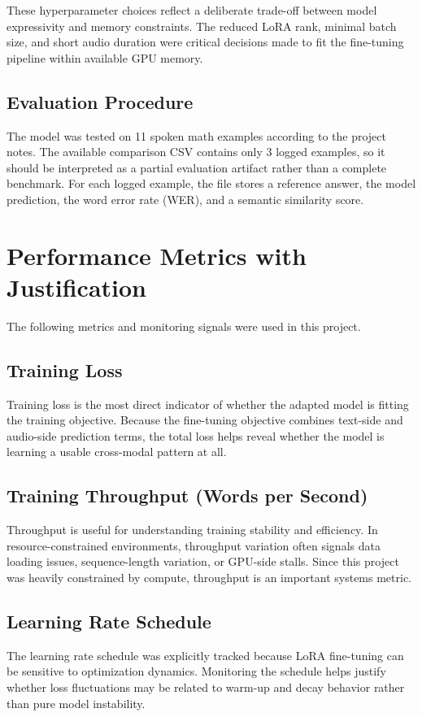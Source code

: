 \documentclass[12pt,a4paper]{article}
\begin{document}
These hyperparameter choices reflect a deliberate trade-off between model expressivity and memory constraints. The reduced LoRA rank, minimal batch size, and short audio duration were critical decisions made to fit the fine-tuning pipeline within available GPU memory.

\subsection{Evaluation Procedure}
The model was tested on 11 spoken math examples according to the project notes. The available comparison CSV contains only 3 logged examples, so it should be interpreted as a partial evaluation artifact rather than a complete benchmark. For each logged example, the file stores a reference answer, the model prediction, the word error rate (WER), and a semantic similarity score.

\section{Performance Metrics with Justification}
The following metrics and monitoring signals were used in this project.

\subsection{Training Loss}
Training loss is the most direct indicator of whether the adapted model is fitting the training objective. Because the fine-tuning objective combines text-side and audio-side prediction terms, the total loss helps reveal whether the model is learning a usable cross-modal pattern at all.

\subsection{Training Throughput (Words per Second)}
Throughput is useful for understanding training stability and efficiency. In resource-constrained environments, throughput variation often signals data loading issues, sequence-length variation, or GPU-side stalls. Since this project was heavily constrained by compute, throughput is an important systems metric.

\subsection{Learning Rate Schedule}
The learning rate schedule was explicitly tracked because LoRA fine-tuning can be sensitive to optimization dynamics. Monitoring the schedule helps justify whether loss fluctuations may be related to warm-up and decay behavior rather than pure model instability.
\end{document}
